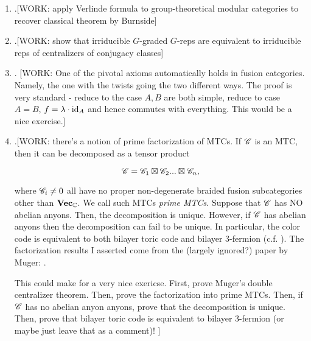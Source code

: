 \begin{enumerate}[\thesection .1.]

\item .[WORK: apply Verlinde formula to group-theoretical modular categories to recover classical theorem by Burnside]

\item .[WORK: show that irriducible $G$-graded $G$-reps are equivalent to irriducible reps of centralizers of conjugacy classes]

\item . [WORK: One of the pivotal axioms automatically holds in fusion categories. Namely, the one with the twists going the two different ways. The proof is very standard - reduce to the case $A,B$ are both simple, reduce to case $A=B$, $f=\lambda\cdot \operatorname{id}_{A}$ and hence commutes with everything. This would be a nice exercise.]

\item .[WORK: there's a notion of prime factorization of MTCs. If $\mathscr{C}$ is an MTC, then it can be decomposed as a tensor product

$$\mathscr{C}=\mathscr{C}_1\boxtimes \mathscr{C}_2...\boxtimes \mathscr{C}_n,$$

where $\mathscr{C}_i\neq 0$ all have no proper non-degenerate braided fusion subcategories other than $\mathbf{Vec}_{\mathbb{C}}$. We call such MTCs \textit{prime MTCs}. Suppose that $\mathscr{C}$ has NO abelian anyons. Then, the decomposition is unique. However, if $\mathscr{C}$ has abelian anyons then the decomposition can fail to be unique. In particular, the color code is equivalent to both bilayer toric code and bilayer 3-fermion (c.f. \cite{kesselring2018boundaries}). The factorization results I asserted come from the (largely ignored?) paper by Muger: \cite{muger2002structure}.

This could make for a very nice exericse. First, prove Muger's double centralizer theorem. Then, prove the factorization into prime MTCs. Then, if $\mathscr{C}$ has no abelian anyon anyons, prove that the decomposition is unique. Then, prove that bilayer toric code is equivalent to bilayer 3-fermion (or maybe just leave that as a comment)! ]

\end{enumerate}
